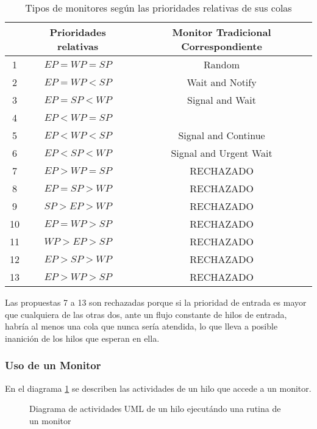 \begin{table}[H]
\centering
\begin{tabular}{|c|c|c|}
\hline
 & Prioridades relativas & Monitor Tradicional Correspondiente \\ \hline
1 & $EP = WP = SP$ & Random\\ \hline
2 & $EP = WP < SP$ & Wait and Notify\\ \hline
3 & $EP = SP < WP$ & Signal and Wait\\ \hline
4 & $EP < WP = SP$ & \\ \hline
5 & $EP < WP < SP$ & Signal and Continue\\ \hline
6 & $EP < SP < WP$ & Signal and Urgent Wait\\ \hline
7 & $EP > WP = SP$ & RECHAZADO\\ \hline
8 & $EP = SP > WP$ & RECHAZADO\\ \hline
9 & $SP > EP > WP$ & RECHAZADO\\ \hline
10 & $EP = WP > SP$ & RECHAZADO\\ \hline
11 & $WP > EP > SP$ & RECHAZADO\\ \hline
12 & $EP > SP > WP$ & RECHAZADO\\ \hline
13 & $EP > WP > SP$ & RECHAZADO\\ \hline
\end{tabular}
\caption{Tipos de monitores según las prioridades relativas de sus colas}
\label{tab:prioridades_monitores}
\end{table}

Las propuestas 7 a 13 son rechazadas porque si la prioridad de entrada es mayor
que cualquiera de las otras dos, ante un flujo constante de hilos de
entrada, habría al menos una cola que nunca sería atendida, lo que lleva a
posible inanición de los hilos que esperan en ella.

\subsubsection{Uso de un Monitor}
En el diagrama \ref{fig:actividad_hilo_monitor} se describen las actividades
de un hilo que accede a un monitor.

\begin{figure}[H]
  \centering
  \caption{Diagrama de actividades UML de un hilo ejecutándo una rutina de
  un monitor}
  \label{fig:actividad_hilo_monitor}
\end{figure}

